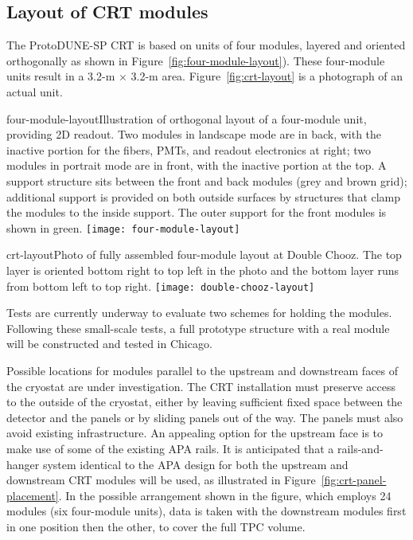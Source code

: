 \subsection{Layout of CRT modules}

The ProtoDUNE-SP CRT is based on units of four modules, layered and oriented orthogonally as shown in Figure~\ref{fig:four-module-layout}). These four-module units result in a 3.2-m $\times$ 3.2-m area.  Figure~\ref{fig:crt-layout} is a photograph of an actual unit.

\begin{cdrfigure}{four-module-layout}{Illustration of orthogonal layout of a four-module unit, providing 2D readout. Two modules in landscape mode are in back, with the inactive portion for the fibers, PMTs, and readout electronics at right; two modules in portrait mode are in front, with the inactive portion at the top. A support structure sits between the front and back modules (grey and brown grid); additional support is provided on both outside surfaces by structures that clamp the modules to the inside support. The outer support for the front modules is shown in green.}
  \texttt{[image: four-module-layout]}
 \end{cdrfigure}


\begin{cdrfigure}{crt-layout}{Photo of fully assembled four-module layout at Double Chooz. The top layer is oriented bottom right to top left in the photo and the bottom layer runs from bottom left to top right.}
  \texttt{[image: double-chooz-layout]}
\end{cdrfigure}

Tests are currently underway to evaluate two schemes for holding the modules. Following these small-scale tests, a full prototype structure with a real module will be constructed and tested in Chicago.

Possible locations for modules parallel to the upstream and downstream faces of the cryostat are under investigation. %
The CRT installation must preserve access to the outside of the cryostat, either by leaving sufficient fixed space between the detector and the panels or by sliding panels out of the way. 
The panels must also avoid existing infrastructure. An appealing option for the upstream face is to make use of some of the existing APA rails. It is anticipated that a rails-and-hanger system identical to the APA design for both the upstream and downstream CRT modules will be used, as illustrated in Figure~\ref{fig:crt-panel-placement}. In the possible arrangement shown in the figure, which employs 24 modules (six four-module units), data is taken with the downstream modules first in one position then the other, to cover the full TPC volume.


